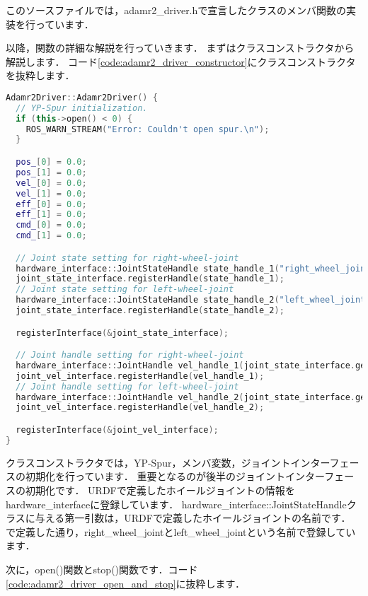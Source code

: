 \documentclass[{../../master}]{subfiles}
\begin{document}
このソースファイルでは，\textsf{adamr2\_driver.h}で宣言したクラスのメンバ関数の実装を行っています．

以降，関数の詳細な解説を行っていきます．
まずはクラスコンストラクタから解説します．
コード\ref{code:adamr2_driver_constructor}にクラスコンストラクタを抜粋します．

\begin{lstlisting}[language=C++, label=code:adamr2_driver_constructor, caption=Class Constructor in \textsf{adamr2\_driver.cpp}]
Adamr2Driver::Adamr2Driver() {
  // YP-Spur initialization.
  if (this->open() < 0) {
    ROS_WARN_STREAM("Error: Couldn't open spur.\n");
  }

  pos_[0] = 0.0;
  pos_[1] = 0.0;
  vel_[0] = 0.0;
  vel_[1] = 0.0;
  eff_[0] = 0.0;
  eff_[1] = 0.0;
  cmd_[0] = 0.0;
  cmd_[1] = 0.0;

  // Joint state setting for right-wheel-joint
  hardware_interface::JointStateHandle state_handle_1("right_wheel_joint", &pos_[0], &vel_[0], &eff_[0]);
  joint_state_interface.registerHandle(state_handle_1);
  // Joint state setting for left-wheel-joint
  hardware_interface::JointStateHandle state_handle_2("left_wheel_joint", &pos_[1], &vel_[0], &eff_[0]);
  joint_state_interface.registerHandle(state_handle_2);

  registerInterface(&joint_state_interface);

  // Joint handle setting for right-wheel-joint
  hardware_interface::JointHandle vel_handle_1(joint_state_interface.getHandle("right_wheel_joint"), &cmd_[0]);
  joint_vel_interface.registerHandle(vel_handle_1);
  // Joint handle setting for left-wheel-joint
  hardware_interface::JointHandle vel_handle_2(joint_state_interface.getHandle("left_wheel_joint"), &cmd_[1]);
  joint_vel_interface.registerHandle(vel_handle_2);

  registerInterface(&joint_vel_interface);
}
\end{lstlisting}

クラスコンストラクタでは，YP-Spur，メンバ変数，ジョイントインターフェースの初期化を行っています．
重要となるのが後半のジョイントインターフェースの初期化です．
URDFで定義したホイールジョイントの情報を\textsf{hardware\_interface}に登録しています．
\textsf{hardware\_interface::JointStateHandle}クラスに与える第一引数は，URDFで定義したホイールジョイントの名前です．
\label{sec:add_wheel_link}で定義した通り，\textsf{right\_wheel\_joint}と\textsf{left\_wheel\_joint}という名前で登録しています．

次に，\textsf{open()}関数と\textsf{stop()}関数です．コード\ref{code:adamr2_driver_open_and_stop}に抜粋します．
\end{document}

